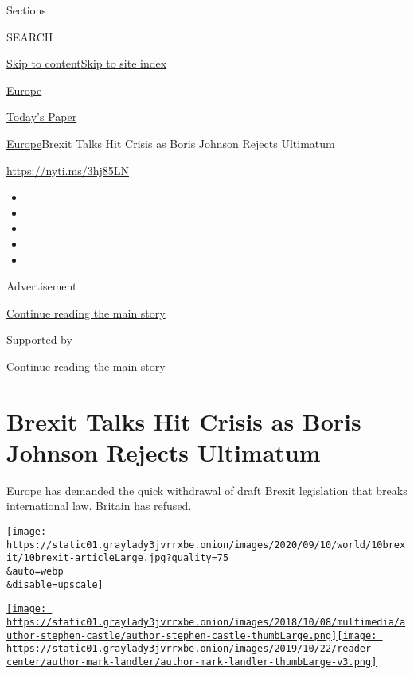 Sections

SEARCH

\protect\hyperlink{site-content}{Skip to
content}\protect\hyperlink{site-index}{Skip to site index}

\href{https://www.nytimes3xbfgragh.onion/section/world/europe}{Europe}

\href{https://myaccount.nytimes3xbfgragh.onion/auth/login?response_type=cookie\&client_id=vi}{}

\href{https://www.nytimes3xbfgragh.onion/section/todayspaper}{Today's
Paper}

\href{/section/world/europe}{Europe}\textbar{}Brexit Talks Hit Crisis as
Boris Johnson Rejects Ultimatum

\url{https://nyti.ms/3hj85LN}

\begin{itemize}
\item
\item
\item
\item
\item
\end{itemize}

Advertisement

\protect\hyperlink{after-top}{Continue reading the main story}

Supported by

\protect\hyperlink{after-sponsor}{Continue reading the main story}

\hypertarget{brexit-talks-hit-crisis-as-boris-johnson-rejects-ultimatum}{%
\section{Brexit Talks Hit Crisis as Boris Johnson Rejects
Ultimatum}\label{brexit-talks-hit-crisis-as-boris-johnson-rejects-ultimatum}}

Europe has demanded the quick withdrawal of draft Brexit legislation
that breaks international law. Britain has refused.

\texttt{[image: https://static01.graylady3jvrrxbe.onion/images/2020/09/10/world/10brexit/10brexit-articleLarge.jpg?quality=75\\\&auto=webp\\\&disable=upscale]}

\href{https://www.nytimes3xbfgragh.onion/by/stephen-castle}{\texttt{[image: https://static01.graylady3jvrrxbe.onion/images/2018/10/08/multimedia/author-stephen-castle/author-stephen-castle-thumbLarge.png]}}\href{https://www.nytimes3xbfgragh.onion/by/mark-landler}{\texttt{[image: https://static01.graylady3jvrrxbe.onion/images/2019/10/22/reader-center/author-mark-landler/author-mark-landler-thumbLarge-v3.png]}}

